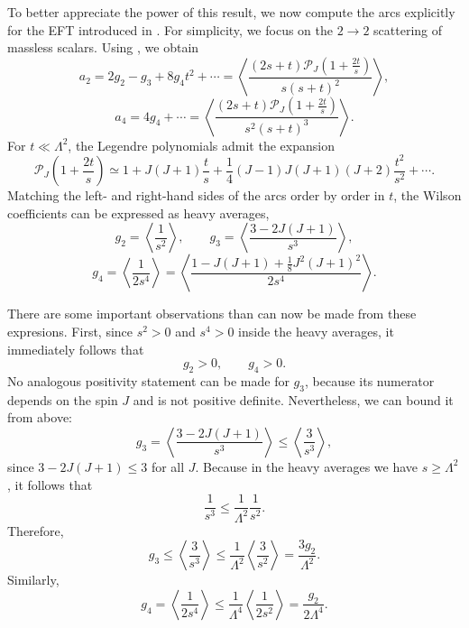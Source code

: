 To better appreciate the power of this result, we now compute the arcs explicitly for the EFT introduced in . For simplicity, we focus on the $2 \rightarrow 2$ scattering of massless scalars. Using , we obtain \autocite{Caron-Huot:2020cmc}
\begin{equation}
a_2 = 2g_2 - g_3 + 8 g_4 t^2 + \cdots
= \left\langle \frac{(2s+t)\mathcal{P}_J\left(1+\frac{2t}{s}\right)}{s (s+t)^2} \right\rangle ,
\end{equation}
\begin{equation}
a_4 = 4g_4 + \cdots
= \left\langle \frac{(2s+t)\mathcal{P}_J\left(1+\frac{2t}{s}\right)}{s^2 (s+t)^3} \right\rangle .
\end{equation}
For $t \ll \Lambda^2$, the Legendre polynomials admit the expansion
\begin{equation}
\mathcal{P}_J\left(1+\frac{2t}{s}\right)
\simeq
1
+ J(J+1)\frac{t}{s}
+ \frac{1}{4}(J-1)J(J+1)(J+2)\frac{t^2}{s^2}
+ \cdots .
\end{equation}
Matching the left- and right-hand sides of the arcs order by order in $t$, the Wilson coefficients can be expressed as heavy averages,
\begin{equation*}
g_2 = \left\langle \frac{1}{s^2} \right\rangle,
\qquad
g_3 = \left\langle \frac{3 - 2J(J+1)}{s^3} \right\rangle,
\end{equation*}
\begin{equation*}
g_4 = \left\langle \frac{1}{2s^4} \right\rangle
= \left\langle
\frac{1 - J(J+1) + \tfrac{1}{8} J^2 (J+1)^2}{2 s^4}
\right\rangle .
\end{equation*}

There are some important observations than can now be made from these expresions.
First, since $s^2 > 0$ and $s^4 > 0$ inside the heavy averages, it immediately follows that
\begin{equation}
g_2 > 0,
\qquad
g_4 > 0.
\end{equation}
No analogous positivity statement can be made for $g_3$, because its numerator depends on the spin $J$ and is not positive definite.
Nevertheless, we can bound it from above:
\begin{equation}
g_3
= \left\langle \frac{3 - 2J(J+1)}{s^3} \right\rangle
\leq
\left\langle \frac{3}{s^3} \right\rangle ,
\end{equation}
since $3 - 2J(J+1) \leq 3$ for all $J$.
Because in the heavy averages we have $s \geq \Lambda^2$, it follows that
\begin{equation}
\frac{1}{s^3} \leq \frac{1}{\Lambda^2}\frac{1}{s^2}.
\end{equation}
Therefore,
\begin{equation}
g_3
\leq
\left\langle \frac{3}{s^3} \right\rangle
\leq
\frac{1}{\Lambda^2}
\left\langle \frac{3}{s^2} \right\rangle
= \frac{3 g_2}{\Lambda^2}.
\end{equation}
Similarly,
\begin{equation}
g_4
= \left\langle \frac{1}{2 s^4} \right\rangle
\leq
\frac{1}{\Lambda^4}
\left\langle \frac{1}{2 s^2} \right\rangle
= \frac{g_2}{2 \Lambda^4}.
\end{equation}

